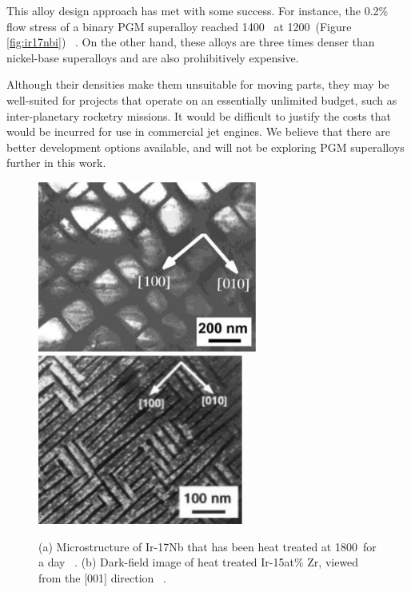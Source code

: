 This alloy design approach has met with some success.  For instance, the 0.2\% flow stress of a binary PGM superalloy reached 1400  \mega\pascal\ at 1200\celsius\ (Figure \ref{fig:ir17nbi}) ~\cite{mitarai99}.  On the other hand, these alloys are three times denser than nickel-base superalloys and are also prohibitively expensive. 

 Although their densities make them unsuitable for moving parts, they may be well-suited for projects that operate on an essentially unlimited budget, such as inter-planetary rocketry missions.  It would be difficult to justify the costs that would be incurred for use in commercial jet engines.  We believe that there are better development options available, and will not be exploring PGM superalloys further in this work. 


%
\begin{figure}[H]
\begin{center}
\includegraphics[width=7.2cm]{ir17nb}
\includegraphics[width=6.75cm]{ir15zr}
\caption{(a) Microstructure of Ir-17Nb that has been heat treated at 1800\celsius\ for a day ~\cite{mitarai98}.  (b) Dark-field image of heat treated Ir-15at\% Zr, viewed from the [001] direction ~\cite{mitarai99}.}
\label{fig:ir17nb}
\end{center}
\end{figure}
%
%
